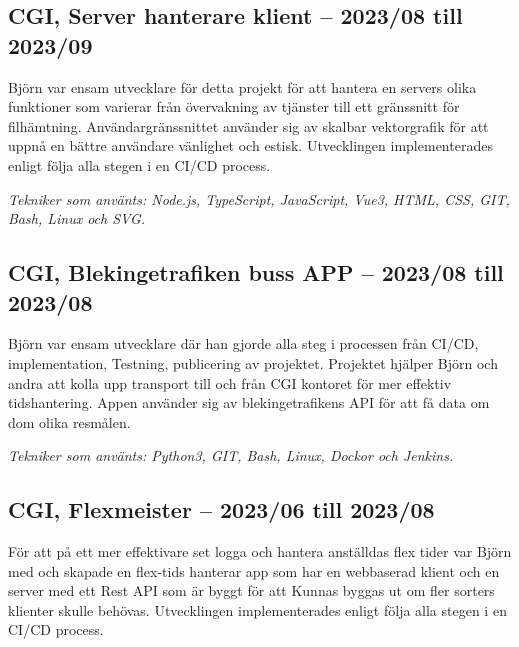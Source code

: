 \begin{minipage}[t]{0.9\textwidth}
	\subsection*{\textcolor{colorTitelErfarenhet}{CGI, Server hanterare klient – 2023/08 till 2023/09}}
	Björn var ensam utvecklare för detta projekt för att hantera en servers olika funktioner som 
	varierar från övervakning av tjänster till ett gränssnitt för filhämtning. Användargränssnittet 
	använder sig av skalbar vektorgrafik för att uppnå en bättre användare vänlighet och estisk. 
	Utvecklingen implementerades enligt följa alla stegen i en CI/CD process. 
	
	\vspace{5pt}\textit{Tekniker som använts: Node.js, TypeScript, JavaScript, Vue3, HTML, CSS, GIT, Bash, Linux och SVG.}
	
	\vspace{15pt} %
	
    \subsection*{\textcolor{colorTitelErfarenhet}{CGI, Blekingetrafiken buss APP – 2023/08 till 2023/08}}
    Björn var ensam utvecklare där han gjorde alla steg i processen från CI/CD, implementation, 
    Testning, publicering av projektet. Projektet hjälper Björn och andra att kolla upp transport 
    till och från CGI kontoret för mer effektiv tidshantering. Appen använder sig av blekingetrafikens 
    API för att få data om dom olika resmålen.
    
    \vspace{5pt}\textit{Tekniker som använts: Python3, GIT, Bash, Linux, Dockor och Jenkins.}
    
    \vspace{15pt} %
    
    \subsection*{\textcolor{colorTitelErfarenhet}{CGI, Flexmeister – 2023/06 till 2023/08}}
    För att på ett mer effektivare set logga och hantera anställdas flex tider var Björn med och 
    skapade en flex-tids hanterar app som har en webbaserad klient och en server med ett Rest API som är 
    byggt för att Kunnas byggas ut om fler sorters klienter skulle behövas. Utvecklingen implementerades 
    enligt följa alla stegen i en CI/CD process.
  

\end{minipage}
